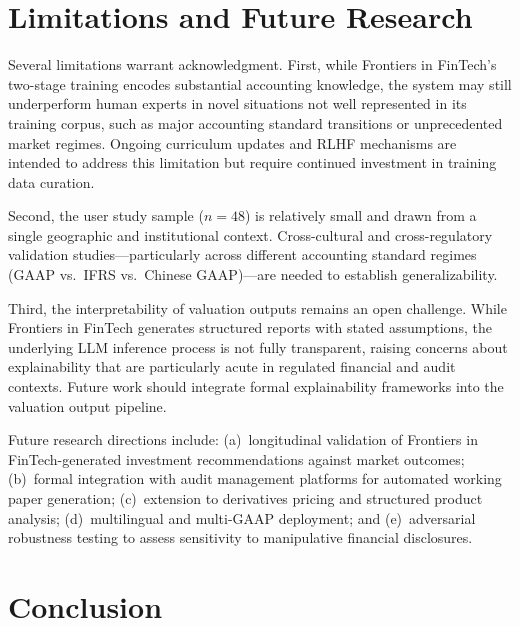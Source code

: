 \documentclass[12pt,letterpaper]{article}
\begin{document}
\section{Limitations and Future Research}
\label{sec:limitations}

Several limitations warrant acknowledgment.
First, while Frontiers in FinTech's two-stage training encodes substantial
accounting knowledge, the system may still underperform human experts
in novel situations not well represented in its training corpus,
such as major accounting standard transitions or unprecedented market
regimes.
Ongoing curriculum updates and RLHF mechanisms are intended to address
this limitation but require continued investment in training data
curation.

Second, the user study sample ($n = 48$) is relatively small and
drawn from a single geographic and institutional context.
Cross-cultural and cross-regulatory validation studies---particularly
across different accounting standard regimes (GAAP vs.\ IFRS vs.\
Chinese GAAP)---are needed to establish generalizability.

Third, the interpretability of valuation outputs remains an open
challenge.
While Frontiers in FinTech generates structured reports with stated assumptions,
the underlying LLM inference process is not fully transparent, raising
concerns about explainability that are particularly acute in regulated
financial and audit contexts.
Future work should integrate formal explainability frameworks
\citep{arrieta2020} into the valuation output pipeline.

Future research directions include: (a)~longitudinal validation of
Frontiers in FinTech-generated investment recommendations against market outcomes;
(b)~formal integration with audit management platforms for automated
working paper generation; (c)~extension to derivatives pricing and
structured product analysis; (d)~multilingual and multi-GAAP
deployment; and (e)~adversarial robustness testing to assess sensitivity
to manipulative financial disclosures.

\section{Conclusion}
\label{sec:conclusion}
\end{document}
